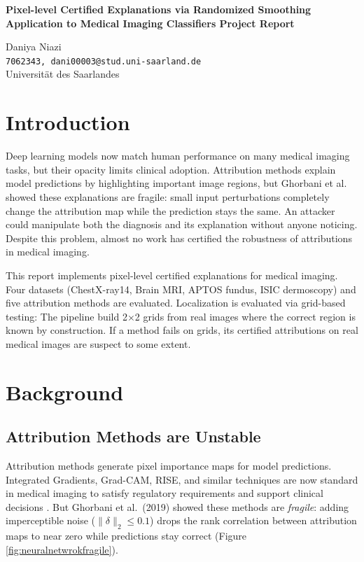 \documentclass[11pt]{article}
\begin{document}
\begin{center}
{\Large\bfseries Pixel-level Certified Explanations via Randomized Smoothing
\\ Application to Medical Imaging Classifiers Project Report \par}
{\large Daniya Niazi \\}
{\texttt{7062343, dani00003@stud.uni-saarland.de} \\}
{Universit{\"a}t des Saarlandes}
\end{center}

\vspace{1em}
\section{Introduction}

Deep learning models now match human performance on many medical imaging tasks, but their opacity limits clinical adoption. Attribution methods explain model predictions by highlighting important image regions, but Ghorbani et al. showed these explanations are fragile: small input perturbations completely change the attribution map while the prediction stays the same. An attacker could manipulate both the diagnosis and its explanation without anyone noticing. Despite this problem, almost no work has certified the robustness of attributions in medical imaging.

This report implements pixel-level certified explanations for medical imaging. Four datasets (ChestX-ray14, Brain MRI, APTOS fundus, ISIC dermoscopy) and five attribution methods are evaluated. Localization is evaluated via grid-based testing: The pipeline build 2×2 grids from real images where the correct region is known by construction. If a method fails on grids, its certified attributions on real medical images are suspect to some extent.

\section{Background}

\subsection{Attribution Methods are Unstable}

Attribution methods generate pixel importance maps for model predictions. Integrated Gradients, Grad-CAM, RISE, and similar techniques are now standard in medical imaging to satisfy regulatory requirements and support clinical decisions \citep{obermeyer2016predicting}. But Ghorbani et al.~(2019) \citep{ghorbani2019interpretation} showed these methods are \emph{fragile}: adding imperceptible noise ($\|\delta\|_2 \le 0.1$) drops the rank correlation between attribution maps to near zero while predictions stay correct (Figure \ref{fig:neuralnetwrokfragile}). 
\end{document}
